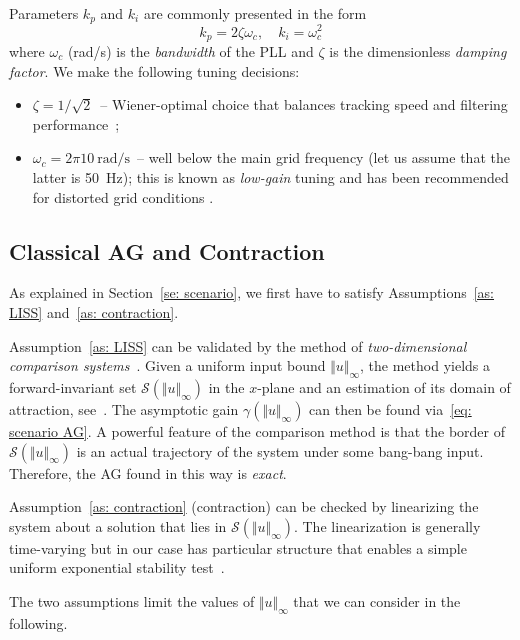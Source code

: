 \documentclass[letterpaper, 10 pt, conference]{ieeeconf}
\newcommand{\norm}[1]{\Vert #1 \Vert}
\newcommand{\calS}{\mathcal{S}}
\begin{document}
Parameters $k_p$ and $k_i$ are commonly presented in the form
\begin{equation}
    k_p = 2\zeta\omega_c, \quad k_i = \omega_c^2
\end{equation}
where $\omega_c$ (rad/s) is the \emph{bandwidth} of the PLL and $\zeta$ is the dimensionless \emph{damping factor}. We make the following tuning decisions:
\begin{itemize}
    \item $\zeta = 1/\sqrt{2}$~-- Wiener-optimal choice that balances tracking speed and filtering performance~\cite{chungPhaseTrackingSystem2000};
    \item $\omega_c = 2\pi 10\ \mathrm{rad/s}$~-- well below the main grid frequency (let us assume that the latter is 50~Hz); this is known as \emph{low-gain} tuning and has been recommended for distorted grid conditions \cite{freijedoTuningPhaselockedLoops2009}.
\end{itemize}


\subsection{Classical AG and Contraction}
\label{se: example contraction}

As explained in Section~\ref{se: scenario}, we first have to satisfy Assumptions~\ref{as: LISS} and~\ref{as: contraction}.

Assumption~\ref{as: LISS} can be validated by the method of \emph{two-dimensional comparison systems}~\cite{ponomarevNonlinearAnalysisSynchronous2024}. Given a uniform input bound $\norm{u}_\infty$, the method yields a forward-invariant set $\calS(\norm{u}_\infty)$ in the $x$-plane and an estimation of its domain of attraction, see~\cite[Fig.~4]{ponomarevNonlinearAnalysisSynchronous2024}. The asymptotic gain $\gamma(\norm{u}_\infty)$ can then be found via~\eqref{eq: scenario AG}. A powerful feature of the comparison method is that the border of $\calS(\norm{u}_\infty)$ is an actual trajectory of the system under some bang-bang input. Therefore, the AG found in this way is \emph{exact}.

Assumption~\ref{as: contraction} (contraction) can be checked by linearizing the system about a solution that lies in $\calS(\norm{u}_\infty)$. The linearization is generally time-varying but in our case has particular structure that enables a simple uniform exponential stability test~\cite[Lemma~2]{ponomarevNonlinearAnalysisSynchronous2024}.

The two assumptions limit the values of $\norm{u}_\infty$ that we can consider in the following.
\end{document}
